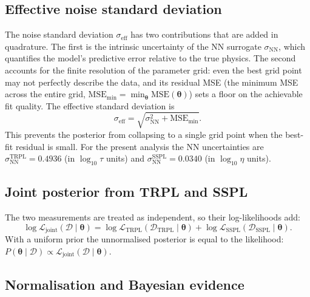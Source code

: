 \documentclass[a4paper,11pt]{article}
\newcommand{\btheta}{\boldsymbol{\theta}}
\newcommand{\MSE}{\mathrm{MSE}}
\newcommand{\TRPL}{\mathrm{TRPL}}
\newcommand{\SSPL}{\mathrm{SSPL}}
\newcommand{\effNN}{\mathrm{eff}}
\newcommand{\NN}{\mathrm{NN}}
\newcommand{\logten}{\log_{10}}
\begin{document}
\subsection{Effective noise standard deviation}

The noise standard deviation $\sigma_\effNN$ has two contributions that are
added in quadrature. The first is the intrinsic uncertainty of the NN surrogate
$\sigma_\NN$, which quantifies the model's predictive error relative to the
true physics. The second accounts for the finite resolution of the parameter
grid: even the best grid point may not perfectly describe the data, and its
residual MSE (the minimum MSE across the entire grid,
$\MSE_\mathrm{min} = \min_\btheta \MSE(\btheta)$) sets a floor on the
achievable fit quality. The effective standard deviation is
\begin{equation}
  \sigma_\effNN
  = \sqrt{\sigma_\NN^2 + \MSE_\mathrm{min}}.
  \label{eq:sigma_eff}
\end{equation}
This prevents the posterior from collapsing to a single grid point when the
best-fit residual is small.  For the present analysis the NN uncertainties are
$\sigma_\NN^\TRPL = 0.4936$ (in $\logten\tau$ units) and
$\sigma_\NN^\SSPL = 0.0340$ (in $\logten\eta$ units).

\subsection{Joint posterior from TRPL and SSPL}

The two measurements are treated as independent, so their log-likelihoods add:
\begin{equation}
  \log\mathcal{L}_\mathrm{joint}(\mathcal{D}\mid\btheta)
  = \log\mathcal{L}_\TRPL(\mathcal{D}_\TRPL\mid\btheta)
  + \log\mathcal{L}_\SSPL(\mathcal{D}_\SSPL\mid\btheta).
  \label{eq:joint_loglik}
\end{equation}
With a uniform prior the unnormalised posterior is equal to the likelihood:
$P(\btheta\mid\mathcal{D}) \propto \mathcal{L}_\mathrm{joint}(\mathcal{D}\mid\btheta)$.

\subsection{Normalisation and Bayesian evidence}
\end{document}
